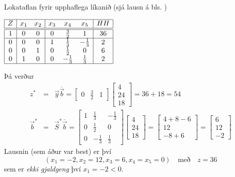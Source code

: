  \begin{lausn}Lokataflan fyrir upphaflega líkanið (sjá lausn á bls. \pageref{wyndor:simplex})
 \begin{center}
{\renewcommand{\arraystretch}{1.5} \renewcommand{\tabcolsep}{0.2cm}
{\scriptsize
$\begin{array}{|c|cc|ccc|c|} \hline 
 Z &  x_1 &  x_2 &   x_3 &  x_4 &  x_5 &  HH   \\ 
\hline\hline 
 1 & 0 & 0 & 0 & \frac{3}{2} & 1 &  36 \\ \hline
 0 & 0 & 0 & 1 & \frac{1}{3} & -\frac{1}{3} & 2 \\
 0 & 0 & 1 & 0 & \frac{1}{2} & 0 & 6  \\
 0 & 1 & 0 & 0 &  -\frac{1}{3} & \frac{1}{3} & 2  \\ \hline 
\end{array}$
}}\end{center} 
Þá verður
\begin{eqnarray*}
 z^*&=&\vec{y}\overline{\vec{b}}=\begin{bmatrix}0 &\frac{3}{2}&1\end{bmatrix}\begin{bmatrix}4\\24\\18\end{bmatrix}=36+18=54\\
 \vec{b}^*&=&\vec{S}^*\overline{\vec{b}}=\begin{bmatrix} 1 & \frac{1}{3} & -\frac{1}{3} \\ 0 & \frac{1}{2} & 0\\ 0 & -\frac{1}{3} & \frac{1}{3}\end{bmatrix}\begin{bmatrix}4\\24\\18\end{bmatrix}=\begin{bmatrix}4+8-6\\12\\-8+6\end{bmatrix}=\begin{bmatrix}6\\12\\-2\end{bmatrix}
\end{eqnarray*}
Lausnin (sem áður var best) er því 
$$ (x_1=-2,x_2=12,x_3=6,x_4=x_5=0)\quad\mbox{með}\quad z=36$$
sem er \emph{ekki gjaldgeng} því $x_1=-2<0$. 


\end{lausn}

